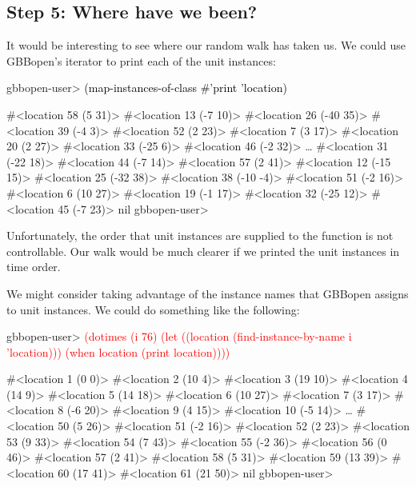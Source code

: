 \documentclass[10pt,twoside,english,pdftex]{article}
\begin{document}
\subsection*{Step 5:  Where have we been?}

%
%
It would be interesting to see where our random walk has taken us.  We could
use GBBopen's  iterator to print each of
the  unit instances:
%
\W\supp
\begin{example}
\textcolor{darkergray}{%
  gbbopen-user> \textcolor{black}{(map-instances-of-class #'print 'location)}

  #<location 58 (5 31)> 
  #<location 13 (-7 10)> 
  #<location 26 (-40 35)> 
  #<location 39 (-4 3)> 
  #<location 52 (2 23)> 
  #<location 7 (3 17)> 
  #<location 20 (2 27)> 
  #<location 33 (-25 6)> 
  #<location 46 (-2 32)> 
     \textrm{\ldots{}}
  #<location 31 (-22 18)> 
  #<location 44 (-7 14)> 
  #<location 57 (2 41)> 
  #<location 12 (-15 15)> 
  #<location 25 (-32 38)> 
  #<location 38 (-10 -4)> 
  #<location 51 (-2 16)> 
  #<location 6 (10 27)> 
  #<location 19 (-1 17)> 
  #<location 32 (-25 12)> 
  #<location 45 (-7 23)> 
  nil
  gbbopen-user>}
\end{example}
%
Unfortunately, the order that unit instances are supplied to the 
function is not controllable.  Our walk would be much clearer if we printed
the  unit instances in time order.

%
%
We might consider taking advantage of the instance names that GBBopen assigns
to unit instances.  We could do something like the following:
%
\W\supp
\begin{example}
\textcolor{darkergray}{%
  gbbopen-user> \textcolor{red}{(dotimes (i 76)
                  (let ((location (find-instance-by-name i 'location)))
                    (when location
                       (print location))))}

  #<location 1 (0 0)> 
  #<location 2 (10 4)> 
  #<location 3 (19 10)> 
  #<location 4 (14 9)> 
  #<location 5 (14 18)> 
  #<location 6 (10 27)> 
  #<location 7 (3 17)> 
  #<location 8 (-6 20)> 
  #<location 9 (4 15)> 
  #<location 10 (-5 14)> 
     \textrm{\ldots{}}
  #<location 50 (5 26)> 
  #<location 51 (-2 16)> 
  #<location 52 (2 23)> 
  #<location 53 (9 33)> 
  #<location 54 (7 43)> 
  #<location 55 (-2 36)> 
  #<location 56 (0 46)> 
  #<location 57 (2 41)> 
  #<location 58 (5 31)> 
  #<location 59 (13 39)> 
  #<location 60 (17 41)> 
  #<location 61 (21 50)> 
  nil
  gbbopen-user>}
\end{example}
\end{document}
